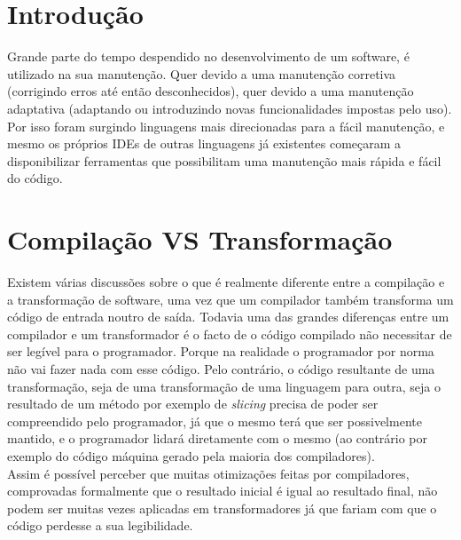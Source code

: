 \documentclass[runningheads,a4paper]{llncs}
\begin{document}
\begin{multicols}{2}
\section{Introdução}
Grande parte do tempo despendido no desenvolvimento de um software, é utilizado na sua manutenção. Quer devido a uma manutenção corretiva (corrigindo erros até então desconhecidos), quer devido a uma manutenção adaptativa (adaptando ou introduzindo novas funcionalidades impostas pelo uso). Por isso foram surgindo linguagens mais direcionadas para a fácil manutenção, e mesmo os próprios IDEs de outras linguagens já existentes começaram a disponibilizar ferramentas que possibilitam uma manutenção mais rápida e fácil do código.

\section{Compilação VS Transformação}
Existem várias discussões sobre o que é realmente diferente entre a compilação e a transformação de software, uma vez que um compilador também transforma um código de entrada noutro de saída. Todavia uma das grandes diferenças entre um compilador e um transformador é o facto de o código compilado não necessitar de ser legível para o programador. Porque na realidade o programador por norma não vai fazer nada com esse código. Pelo contrário, o código resultante de uma transformação, seja de uma transformação de uma linguagem para outra, seja o resultado de um método por exemplo de \emph{slicing} precisa de poder ser compreendido pelo programador, já que o mesmo terá que ser possivelmente mantido, e o programador lidará diretamente com o mesmo (ao contrário por exemplo do código máquina gerado pela maioria dos compiladores).\\
Assim é possível perceber que muitas otimizações feitas por compiladores, comprovadas formalmente que o resultado inicial é igual ao resultado final, não podem ser muitas vezes aplicadas em transformadores já que fariam com que o código perdesse a sua legibilidade.


\end{multicols}
\end{document}
